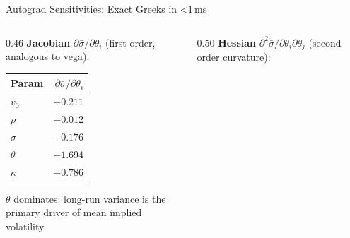 \documentclass[aspectratio=169, 10pt]{beamer}
\begin{document}
\begin{frame}{Autograd Sensitivities: Exact Greeks in \textless1\,ms}

  \begin{columns}[T]
    \begin{column}{0.46\textwidth}
      \textbf{Jacobian} $\partial\bar\sigma/\partial\theta_i$
      (first-order, analogous to vega):

      \vspace{0.3em}
      \begin{center}\small
      \begin{tabular}{@{}lr@{}}
        \toprule
        Param & $\partial\bar\sigma/\partial\theta_i$ \\ \midrule
        $v_0$    & $+0.211$ \\
        $\rho$   & $+0.012$ \\
        $\sigma$ & $-0.176$ \\
        $\theta$ & $+1.694$ \quad{\footnotesize\color{hestonorange}(dominant)}\\
        $\kappa$ & $+0.786$ \\ \bottomrule
      \end{tabular}
      \end{center}
      \vspace{0.3em}
      {\small $\theta$ dominates: long-run variance is the\\
       primary driver of mean implied volatility.}
    \end{column}

    \begin{column}{0.50\textwidth}
      \textbf{Hessian} $\partial^2\bar\sigma/\partial\theta_i\partial\theta_j$
      (second-order curvature):


\end{column}
\end{columns}
\end{frame}
\end{document}
